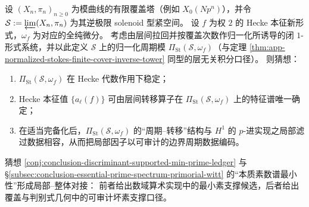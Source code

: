 \begin{conjecture}\label{conj:conclusion-hecke-stokes-reciprocity-solenoid-period-spectrum}
设 \((X_n,\pi_n)_{n\ge 0}\) 为模曲线的有限覆盖塔（例如 \(X_0(Np^n)\)），并令
\(
\mathcal S:=\varprojlim (X_n,\pi_n)
\)
为其逆极限 solenoid 型紧空间。
设 \(f\) 为权 \(2\) 的 Hecke 本征新形式，\(\omega_f\) 为对应的全纯微分。
考虑由层间拉回并按覆盖次数作归一化所诱导的闭 \(1\)-形式系统，并以此定义 \(\mathcal S\) 上的归一化周期模 \(\Pi_{\mathrm{St}}(\mathcal S,\omega_f)\)（与定理 \ref{thm:app-normalized-stokes-finite-cover-inverse-tower} 同型的层无关积分口径）。
则猜想：
\begin{enumerate}
  \item \(\Pi_{\mathrm{St}}(\mathcal S,\omega_f)\) 在 Hecke 代数作用下稳定；
  \item Hecke 本征值 \(\{a_\ell(f)\}\) 可由层间转移算子在 \(\Pi_{\mathrm{St}}(\mathcal S,\omega_f)\) 上的特征谱唯一确定；
  \item 在适当完备化后，\(\Pi_{\mathrm{St}}(\mathcal S,\omega_f)\) 的“周期--转移”结构与 \(H^1\) 的 \(p\)-进实现之局部滤过数据相容，从而把局部因子以可审计的边界周期数据编码。
\end{enumerate}
\end{conjecture}

\begin{remark}[与本质素数谱口径的对接]\label{rem:conclusion-discriminant-ledger-interface}
猜想 \ref{conj:conclusion-discriminant-supported-min-prime-ledger} 与
\S\ref{subsec:conclusion-essential-prime-spectrum-primorial-witt} 的“本质素数谱最小性”形成局部--整体对接：
前者给出数域算术实现中的最小素支撑候选，后者给出覆盖与判别式几何中的可审计坏素支撑口径。
\end{remark}
